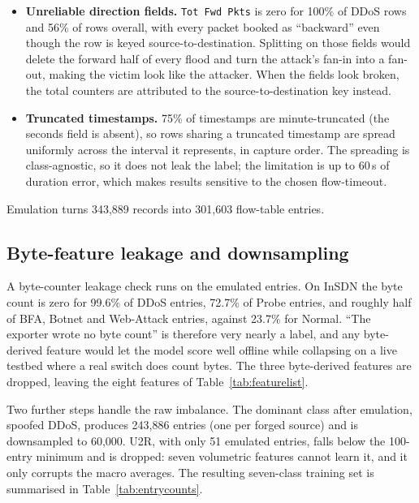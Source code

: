 \documentclass[11pt]{article}
\begin{document}
\begin{itemize}
    \item \textbf{Unreliable direction fields.} \texttt{Tot Fwd Pkts} is zero for 100\% of
    DDoS rows and 56\% of rows overall, with every packet booked as ``backward'' even
    though the row is keyed source-to-destination. Splitting on those fields would delete
    the forward half of every flood and turn the attack's fan-in into a fan-out, making
    the victim look like the attacker. When the fields look broken, the total counters are
    attributed to the source-to-destination key instead.
    \item \textbf{Truncated timestamps.} 75\% of timestamps are minute-truncated (the
    seconds field is absent), so rows sharing a truncated timestamp are spread uniformly
    across the interval it represents, in capture order. The spreading is class-agnostic,
    so it does not leak the label; the limitation is up to 60\,s of duration error, which
    makes results sensitive to the chosen flow-timeout.
\end{itemize}

Emulation turns 343,889 records into 301,603 flow-table entries.

\subsection{Byte-feature leakage and downsampling}
\label{sec:preproc}
A byte-counter leakage check runs on the emulated entries. On InSDN the byte count is zero
for 99.6\% of DDoS entries, 72.7\% of Probe entries, and roughly half of BFA, Botnet and
Web-Attack entries, against 23.7\% for Normal. ``The exporter wrote no byte count'' is
therefore very nearly a label, and any byte-derived feature would let the model score well
offline while collapsing on a live testbed where a real switch does count bytes. The three
byte-derived features are dropped, leaving the eight features of Table~\ref{tab:featurelist}.

Two further steps handle the raw imbalance. The dominant class after emulation, spoofed
DDoS, produces 243,886 entries (one per forged source) and is downsampled to 60,000. U2R,
with only 51 emulated entries, falls below the 100-entry minimum and is dropped: seven
volumetric features cannot learn it, and it only corrupts the macro averages. The
resulting seven-class training set is summarised in Table~\ref{tab:entrycounts}.
\end{document}
